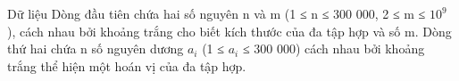 Dữ liệu  
Dòng đầu tiên chứa hai số nguyên n và m (1 ≤ n ≤ 300 000, 2 ≤ m ≤ $10^{9}$   ), cách nhau bởi khoảng trắng cho biết kích thước của đa tập hợp và số m. Dòng thứ hai chứa n số nguyên dương $a_{i}$   (1 ≤ $a_{i}$   ≤ 300 000) cách nhau bởi khoảng trắng thể hiện một hoán vị của đa tập hợp.